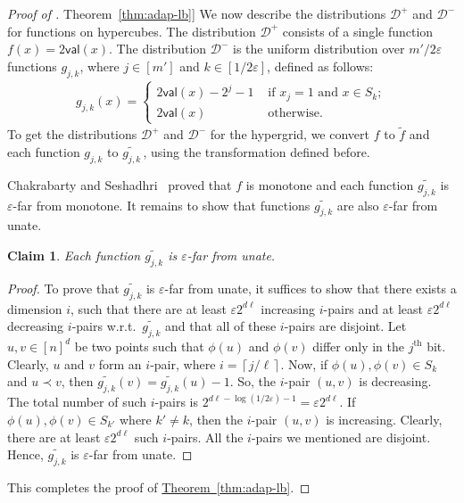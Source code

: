 \documentclass[11pt]{article}
\numberwithin{equation}{section}
\newtheorem{claim}[theorem]{Claim}
\theoremstyle{definition}
\theoremstyle{plain}
\newcommand{\expref}[2]{\hyperref[#2]{#1~\ref{#2}}}
\newcommand{\eps}{\varepsilon}
\newcommand{\ord}[2][th]{\ensuremath{{#2}^{\mathrm{#1}}}}
\newcommand{\ceil}[1]{\left\lceil {#1} \right\rceil}
\newcommand{\Yes}{\ensuremath{\mathcal{D}^+}}
\newcommand{\No}{\ensuremath{\mathcal{D}^-}}
\newcommand{\dec}{\mathsf{val}}
\newcommand{\Thm}[1]{\expref{Theorem}{thm:#1}}
\begin{document}
\begin{proof}[Proof of \Thm{adap-lb}]
We now describe the distributions $\Yes$ and $\No$ for functions on hypercubes.
The distribution $\Yes$ consists of a single function $f(x) = 2 \dec(x)$.
The distribution $\No$ is the uniform distribution over $m'/2\eps$ functions $g_{j,k}$, where $j \in [m']$ and $k \in [1/2\eps]$, defined as follows:
\begin{align*}
    g_{j,k}(x) =
    \begin{cases}
        2\dec(x) - 2^j - 1 &\text{ if } x_j = 1 \text{ and } x \in S_k;\\
        2\dec(x)
        &\text{ otherwise.}
    \end{cases}
\end{align*}
To get the distributions $\Yes$ and $\No$ for the hypergrid, we convert $f$ to $\widetilde{f}$ and each function $g_{j,k}$ to $\widetilde{g_{j,k}}$\,, %
using the transformation defined before.


Chakrabarty and Seshadhri~\cite{CS14} proved that $f$ is monotone and each function $\widetilde{g_{j,k}}$  is $\eps$-far from monotone. It remains to show that functions $\widetilde{g_{j,k}}$ are also $\eps$-far from unate.

\begin{claim}
Each function $\widetilde{g_{j,k}}$ is $\eps$-far from unate.
\end{claim}

\begin{proof}
To prove that $\widetilde{g_{j,k}}$ is $\eps$-far from unate, it suffices to show that there exists a dimension $i$, such that there are at least $\eps 2^{d\ell}$ increasing $i$-pairs and at least $\eps 2^{d\ell}$ decreasing $i$-pairs w.r.t.\ $\widetilde{g_{j,k}}$ and that all of these $i$-pairs are disjoint. Let $u,v \in [n]^d$ be two points such that $\phi(u)$ and $\phi(v)$ differ only in the $\ord{j}$ bit. Clearly, $u$ and $v$ form an $i$-pair, where $i =\ceil{j/\ell}$. Now, if $\phi(u),\phi(v) \in S_k$ and $u \prec v $, then $\widetilde{g_{j,k}}(v) = \widetilde{g_{j,k}}(u) - 1$. So, the $i$-pair $(u,v)$ is decreasing. The total number of such $i$-pairs is  $2^{d\ell - \log(1/2\eps) - 1} = \eps 2^{d\ell}$. If $\phi(u),\phi(v) \in S_{k'}$ where $k' \neq k$, then the $i$-pair $(u,v)$ is increasing. Clearly, there are at least $\eps 2^{d\ell}$ such $i$-pairs. All the $i$-pairs we mentioned are disjoint.
Hence, $\widetilde{g_{j,k}}$ is $\eps$-far from unate.
\end{proof}
This completes the proof of \Thm{adap-lb}.
\end{proof}
\end{document}
